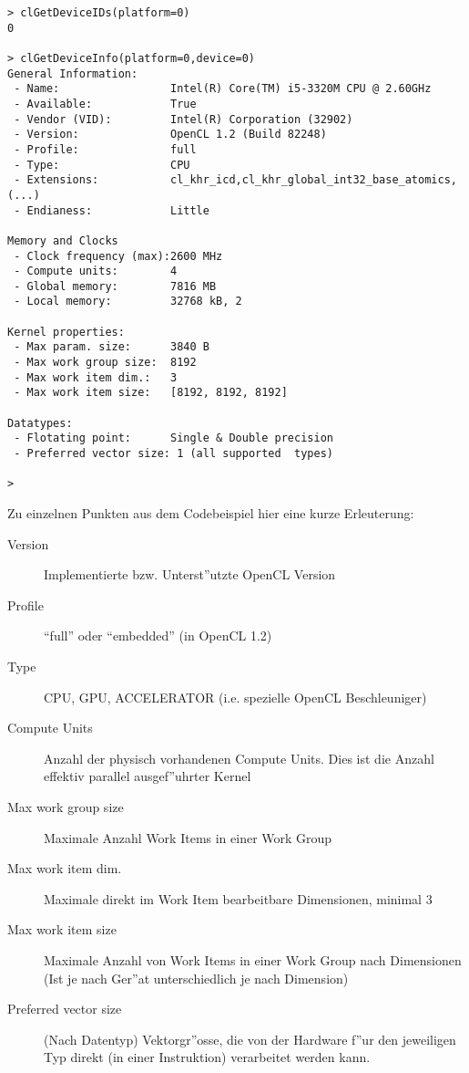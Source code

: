 \begin{refsection}
\begin{verbatim}
> clGetDeviceIDs(platform=0)
0

> clGetDeviceInfo(platform=0,device=0)
General Information:
 - Name:                 Intel(R) Core(TM) i5-3320M CPU @ 2.60GHz
 - Available:            True
 - Vendor (VID):         Intel(R) Corporation (32902)
 - Version:              OpenCL 1.2 (Build 82248)
 - Profile:              full
 - Type:                 CPU 
 - Extensions:           cl_khr_icd,cl_khr_global_int32_base_atomics,(...)
 - Endianess:            Little

Memory and Clocks
 - Clock frequency (max):2600 MHz
 - Compute units:        4
 - Global memory:        7816 MB
 - Local memory:         32768 kB, 2

Kernel properties:
 - Max param. size:      3840 B
 - Max work group size:  8192
 - Max work item dim.:   3
 - Max work item size:   [8192, 8192, 8192]

Datatypes:
 - Flotating point:      Single & Double precision
 - Preferred vector size: 1 (all supported  types)

>
\end{verbatim}


Zu einzelnen Punkten aus dem Codebeispiel hier eine kurze Erleuterung:

\begin{description}
 \item [Version] Implementierte bzw. Unterst''utzte OpenCL Version
 \item [Profile] ``full'' oder ``embedded'' (in OpenCL 1.2)
 \item [Type]    CPU, GPU, ACCELERATOR (i.e. spezielle OpenCL Beschleuniger)
 \item [Compute Units] Anzahl der physisch vorhandenen Compute Units. Dies ist
                 die Anzahl effektiv parallel ausgef''uhrter Kernel
 \item [Max work group size] Maximale Anzahl Work Items in einer Work Group
 \item [Max work item dim.] Maximale direkt im Work Item bearbeitbare Dimensionen, minimal 3
 \item [Max work item size] Maximale Anzahl von Work Items in einer Work Group nach
                 Dimensionen (Ist je nach Ger''at unterschiedlich je nach
                 Dimension)
 \item [Preferred vector size] (Nach Datentyp) Vektorgr''osse, die von der Hardware 
                 f''ur den jeweiligen Typ direkt (in einer Instruktion) verarbeitet
                 werden kann.
 

\end{description}
\end{refsection}
